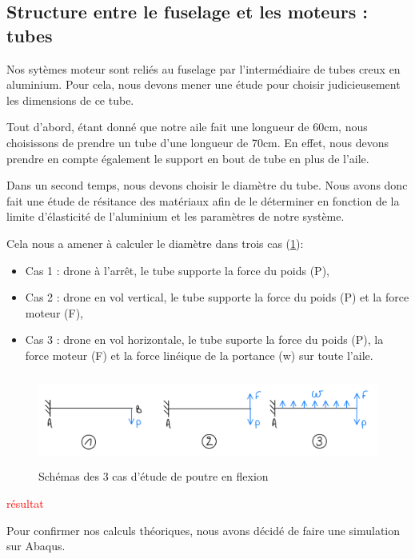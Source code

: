 \documentclass[a4paper,12pt,french]{report}
\begin{document}
\subsection{Structure entre le fuselage et les moteurs : tubes}

Nos sytèmes moteur sont reliés au fuselage par l'intermédiaire de tubes creux en aluminium. Pour cela, nous devons mener une étude pour choisir judicieusement les dimensions de ce tube.\newline

Tout d'abord, étant donné que notre aile fait une longueur de 60cm, nous choisissons de prendre un tube d'une longueur de 70cm. En effet, nous devons prendre en compte également le support en bout de tube en plus de l'aile.\newline

Dans un second temps, nous devons choisir le diamètre du tube. Nous avons donc fait une étude de résitance des matériaux afin de le déterminer en fonction de la limite d'élasticité de l'aluminium et les paramètres de notre système.\newline

Cela nous a amener à calculer le diamètre dans trois cas (\ref{flex}):
\begin{itemize}
    \item Cas 1 : drone à l'arrêt, le tube supporte la force du poids (P),
    \item Cas 2 : drone en vol vertical, le tube supporte la force du poids (P) et la force moteur (F),
    \item Cas 3 : drone en vol horizontale, le tube suporte la force du poids (P), la force moteur (F) et la force linéique de la portance (w) sur toute l'aile.
\end{itemize}

\begin{figure}[h]
    \centering
    \includegraphics[height=3cm]{figures/flexion.jpeg}
    \caption{Schémas des 3 cas d'étude de poutre en flexion}
    \label{flex}
\end{figure}

\textcolor{red}{résultat}

Pour confirmer nos calculs théoriques, nous avons décidé de faire une simulation sur Abaqus.\newline
\end{document}
